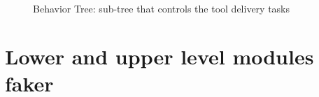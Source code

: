 \begin{figure}[ht]
\begin{center}
{\begin{tikzpicture}
		    \end{tikzpicture}}
		\caption{Behavior Tree: sub-tree that controls the tool delivery tasks}
		\label{fig:DeliverToolTree}
	\end{center}
\end{figure}




\section{Lower and upper level modules faker}
\label{sec:LowerAndUpperLevelModulesFaker}

